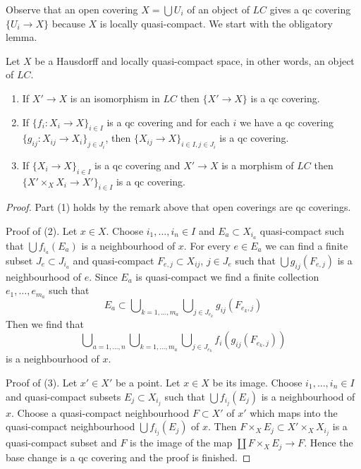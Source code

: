 \noindent
Observe that an open covering $X = \bigcup U_i$ of an object of $\textit{LC}$
gives a qc covering $\{U_i \to X\}$ because $X$ is locally quasi-compact.
We start with the obligatory lemma.

\begin{lemma}
\label{lemma-qc}
Let $X$ be a Hausdorff and locally quasi-compact space, in other words,
an object of $\textit{LC}$.
\begin{enumerate}
\item If $X' \to X$ is an isomorphism in $\textit{LC}$ then
$\{X' \to X\}$ is a qc covering.
\item If $\{f_i : X_i \to X\}_{i\in I}$ is a qc covering and for each
$i$ we have a qc covering $\{g_{ij} : X_{ij} \to X_i\}_{j\in J_i}$, then
$\{X_{ij} \to X\}_{i \in I, j\in J_i}$ is a qc covering.
\item If $\{X_i \to X\}_{i\in I}$ is a qc covering
and $X' \to X$ is a morphism of $\textit{LC}$ then
$\{X' \times_X X_i \to X'\}_{i\in I}$ is a qc covering.
\end{enumerate}
\end{lemma}

\begin{proof}
Part (1) holds by the remark above that open coverings are qc coverings.

\medskip\noindent
Proof of (2). Let $x \in X$. Choose $i_1, \ldots, i_n \in I$ and
$E_a \subset X_{i_a}$ quasi-compact such that $\bigcup f_{i_a}(E_a)$
is a neighbourhood of $x$. For every $e \in E_a$ we can find
a finite subset $J_e \subset J_{i_a}$ and quasi-compact
$F_{e, j} \subset X_{ij}$, $j \in J_e$ such that $\bigcup g_{ij}(F_{e, j})$
is a neighbourhood of $e$. Since $E_a$ is quasi-compact we find
a finite collection $e_1, \ldots, e_{m_a}$ such that
$$
E_a \subset
\bigcup\nolimits_{k = 1, \ldots, m_a}
\bigcup\nolimits_{j \in J_{e_k}} g_{ij}(F_{e_k, j})
$$
Then we find that
$$
\bigcup\nolimits_{a = 1, \ldots, n}
\bigcup\nolimits_{k = 1, \ldots, m_a}
\bigcup\nolimits_{j \in J_{e_k}} f_i(g_{ij}(F_{e_k, j}))
$$
is a neighbourhood of $x$.

\medskip\noindent
Proof of (3). Let $x' \in X'$ be a point. Let $x \in X$ be its image.
Choose $i_1, \ldots, i_n \in I$ and quasi-compact subsets
$E_j \subset X_{i_j}$ such that $\bigcup f_{i_j}(E_j)$ is a
neighbourhood of $x$. Choose a quasi-compact neighbourhood $F \subset X'$
of $x'$ which maps into the quasi-compact neighbourhood
$\bigcup f_{i_j}(E_j)$ of $x$. Then
$F \times_X E_j \subset X' \times_X X_{i_j}$ is a
quasi-compact subset and $F$ is the image of the map
$\coprod F \times_X E_j \to F$. Hence the base change is a
qc covering and the proof is finished.
\end{proof}

